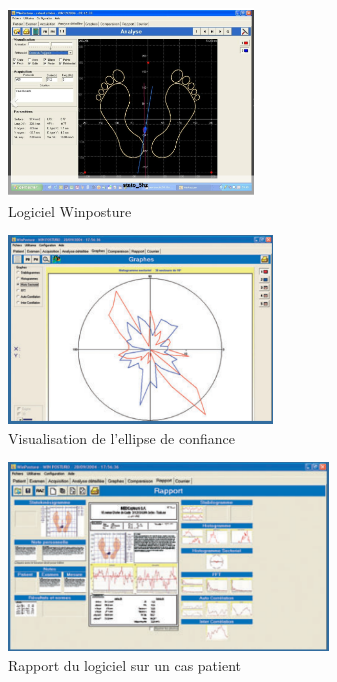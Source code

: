 \begin{figure}[ht]
    \centering
    \begin{subfigure}[b]{0.45\textwidth}
      \centering
      \includegraphics[height=5cm]{images/pression_plantaire/winposture.png}
      \caption{Logiciel Winposture}\label{fig:winposture}
    \end{subfigure}
    \begin{subfigure}[b]{0.5\textwidth}
        \centering
        \includegraphics[height=5cm]{images/analyse_marche/winposture_ellipse.png}
        \caption{Visualisation de l'ellipse de confiance}\label{fig:winposture_ellipse_de_confiance}
    \end{subfigure}
    \begin{subfigure}[b]{0.5\textwidth}
        \centering
        \includegraphics[height=5cm]{images/analyse_marche/winposture_rapport.png}
        \caption{Rapport du logiciel sur un cas patient}\label{fig:winposture_rapport}
    \end{subfigure}
    \begin{subfigure}[b]{0.5\textwidth}

\end{subfigure}
\end{figure}
